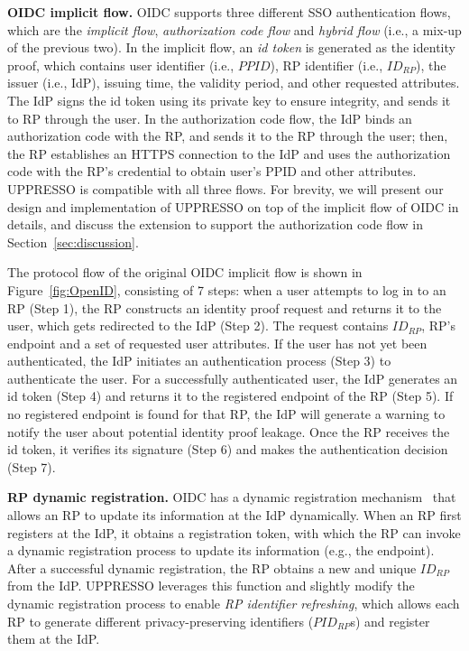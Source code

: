 \vspace{1mm}\noindent\textbf{OIDC implicit flow.} OIDC supports three different SSO authentication flows, which are the {\em implicit flow}, {\em authorization code flow} and {\em hybrid flow} (i.e., a mix-up of the previous two). In the implicit flow, an {\em id token} is generated as the identity proof, which contains user identifier (i.e., $PPID$), RP identifier (i.e., $ID_{RP}$), the issuer (i.e., IdP), issuing time, the validity period, and other requested attributes. The IdP signs the id token using its private key to ensure integrity, and sends it to RP through the user. In the authorization code flow, the IdP binds an authorization code with the RP, and sends it to the RP through the user; then, the RP establishes an HTTPS connection to the IdP %
and uses the authorization code with the RP's credential to obtain user's PPID and other attributes.
UPPRESSO is compatible with all three flows. For brevity, we will present our design and implementation of UPPRESSO on top of the implicit flow of OIDC in details, and discuss the extension to support the authorization code flow in Section~\ref{sec:discussion}.

The protocol flow of the original OIDC implicit flow is shown in Figure~\ref{fig:OpenID}, consisting of 7 steps: when a user attempts to log in to an RP (Step 1), the RP constructs an identity proof request and returns it to the user, which gets redirected to the IdP (Step 2). The request contains $ID_{RP}$, RP's endpoint and a set of requested user attributes. If the user has not yet been authenticated, the IdP initiates an authentication process (Step 3) to authenticate the user. For a successfully authenticated user, the IdP generates an id token (Step 4) and returns it to the registered endpoint of the RP (Step 5). If no registered endpoint is found for that RP, the IdP will generate a warning to notify the user about potential identity proof leakage. Once the RP receives the id token, it verifies its signature (Step 6) and makes the authentication decision (Step 7).

\vspace{1mm}\noindent\textbf{RP dynamic registration.} OIDC has a dynamic registration mechanism~\cite{DynamicRegistration} that allows an RP to update its information at the IdP dynamically. When an RP first registers at the IdP, it obtains a registration token, with which the RP can invoke a dynamic registration process to update its information (e.g., the endpoint). After a successful dynamic registration, the RP obtains a new and unique $ID_{RP}$ from the IdP. UPPRESSO leverages this function and slightly modify the dynamic registration process to enable {\em RP identifier refreshing}, which allows each RP to generate different privacy-preserving identifiers ($PID_{RP}$s) and register them at the IdP.

